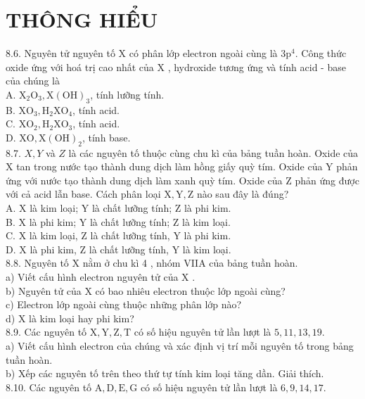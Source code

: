 \documentclass[10pt]{article}
\begin{document}
\section*{THÔNG HIỂU}
8.6. Nguyên tử nguyên tố X có phân lớp electron ngoài cùng là $3 \mathrm{p}^{4}$. Công thức oxide ứng với hoá trị cao nhất của X , hydroxide tương ứng và tính acid - base của chúng là\\
A. $\mathrm{X}_{2} \mathrm{O}_{3}, \mathrm{X}(\mathrm{OH})_{3}$, tính lưỡng tính.\\
B. $\mathrm{XO}_{3}, \mathrm{H}_{2} \mathrm{XO}_{4}$, tính acid.\\
C. $\mathrm{XO}_{2}, \mathrm{H}_{2} \mathrm{XO}_{3}$, tính acid.\\
D. $\mathrm{XO}, \mathrm{X}(\mathrm{OH})_{2}$, tính base.\\
8.7. $X, Y$ và $Z$ là các nguyên tố thuộc cùng chu kì của bảng tuần hoàn. Oxide của X tan trong nước tạo thành dung dịch làm hồng giấy quỳ tím. Oxide của Y phản ứng với nước tạo thành dung dịch làm xanh quỳ tím. Oxide của Z phản ứng được với cả acid lẫn base. Cách phân loại $\mathrm{X}, \mathrm{Y}, \mathrm{Z}$ nào sau đây là đúng?\\
A. X là kim loại; Y là chất lưỡng tính; Z là phi kim.\\
B. X là phi kim; Y là chất lưỡng tính; Z là kim loại.\\
C. X là kim loại, Z là chất lưỡng tính, Y là phi kim.\\
D. X là phi kim, Z là chất lưỡng tính, Y là kim loại.\\
8.8. Nguyên tố X nằm ở chu kì 4 , nhóm VIIA của bảng tuần hoàn.\\
a) Viết cấu hình electron nguyên tử của X .\\
b) Nguyên tử của X có bao nhiêu electron thuộc lớp ngoài cùng?\\
c) Electron lớp ngoài cùng thuộc những phân lớp nào?\\
d) X là kim loại hay phi kim?\\
8.9. Các nguyên tố $\mathrm{X}, \mathrm{Y}, \mathrm{Z}, \mathrm{T}$ có số hiệu nguyên tử lần lượt là $5,11,13,19$.\\
a) Viết cấu hình electron của chúng và xác định vị trí mỗi nguyên tố trong bảng tuần hoàn.\\
b) Xếp các nguyên tố trên theo thứ tự tính kim loại tăng dần. Giải thích.\\
8.10. Các nguyên tố $\mathrm{A}, \mathrm{D}, \mathrm{E}, \mathrm{G}$ có số hiệu nguyên tử lần lượt là $6,9,14,17$.\\
\end{document}
